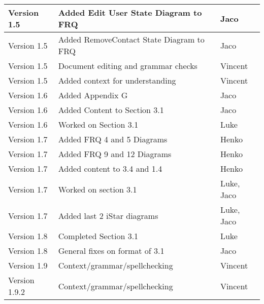 \begin{center}
\begin{tabular}{|l|l|l|}
\hline
Version 1.5 & Added Edit User State Diagram to FRQ & Jaco\\
\hline
Version 1.5 & Added RemoveContact State Diagram to FRQ&Jaco\\
\hline
Version 1.5 & Document editing and grammar checks & Vincent\\
\hline
Version 1.5 & Added context for understanding & Vincent\\
\hline
Version 1.6 & Added Appendix G& Jaco\\
\hline
Version 1.6 & Added Content to Section 3.1&Jaco\\
\hline
Version 1.6 & Worked on Section 3.1&Luke\\
\hline
Version 1.7 & Added FRQ 4 and 5 Diagrams&Henko\\
\hline
Version 1.7 & Added FRQ 9 and 12 Diagrams&Henko\\
\hline
Version 1.7 & Added content to 3.4 and 1.4 &Henko\\
\hline
Version 1.7 & Worked on section 3.1&Luke, Jaco\\
\hline
Version 1.7 & Added last 2 iStar diagrams&Luke, Jaco\\
\hline
Version 1.8 & Completed Section 3.1&Luke\\
\hline
Version 1.8 & General fixes on format of 3.1&Jaco\\
\hline
Version 1.9 & Context/grammar/spellchecking&Vincent\\
\hline
Version 1.9.2 & Context/grammar/spellchecking&Vincent\\
\hline
\end{tabular}
\end{center}